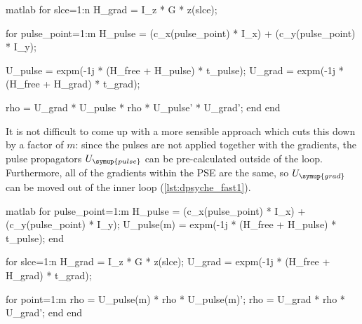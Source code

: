 \begin{mylisting}[htb]
    \centering
\begin{tcbminted}{matlab}
for slce=1:n
    H_grad = I_z * G * z(slce);

    for pulse_point=1:m
        H_pulse = (c_x(pulse_point) * I_x) + (c_y(pulse_point) * I_y);

        U_pulse = expm(-1j * (H_free + H_pulse) * t_pulse);
        U_grad = expm(-1j * (H_free + H_grad) * t_grad);

        rho = U_grad * U_pulse * rho * U_pulse' * U_grad';
    end
end
\end{tcbminted}
\caption[Naive dPSYCHE code]{Rough structure of a naive dPSYCHE implementation. Note that I use the variable name \texttt{slce} as \texttt{slice} is an existing builtin Matlab function.}
\label{lst:dpsyche_slow}
\end{mylisting}

It is not difficult to come up with a more sensible approach which cuts this down by a factor of $m$: since the pulses are not applied together with the gradients, the pulse propagators $U_{\symup{pulse}}$ can be pre-calculated outside of the loop.
Furthermore, all of the gradients within the PSE are the same, so $U_{\symup{grad}}$ can be moved out of the inner loop (\cref{lst:dpsyche_fast1}).

\begin{mylisting}[htb]
    \centering
\begin{tcbminted}{matlab}
for pulse_point=1:m
    H_pulse = (c_x(pulse_point) * I_x) + (c_y(pulse_point) * I_y);
    U_pulse(m) = expm(-1j * (H_free + H_pulse) * t_pulse);
end

for slce=1:n
    H_grad = I_z * G * z(slce);
    U_grad = expm(-1j * (H_free + H_grad) * t_grad);
    
    for point=1:m
        rho = U_pulse(m) * rho * U_pulse(m)';
        rho = U_grad * rho * U_grad';
    end
end
\end{tcbminted}
\caption[Slightly faster dPSYCHE code]{Rough structure of a slightly faster implementation of dPSYCHE.}
\label{lst:dpsyche_fast1}
\end{mylisting}

